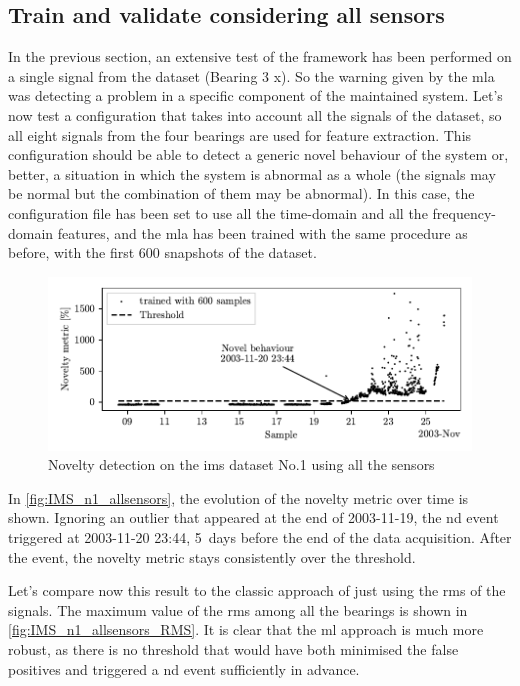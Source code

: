 \subsection{Train and validate considering all sensors}
In the previous section, an extensive test of the framework has been performed on a single signal from the dataset (Bearing 3 x). So the warning given by the \gls{mla} was detecting a problem in a specific component of the maintained system. Let's now test a configuration that takes into account all the signals of the dataset, so all eight signals from the four bearings are used for feature extraction. This configuration should be able to detect a generic novel behaviour of the system or, better, a situation in which the system is abnormal as a whole (the signals may be normal but the combination of them may be abnormal).  In this case, the configuration file has been set to use all the time-domain and all the frequency-domain features, and the \gls{mla} has been trained with the same procedure as before, with the first 600 snapshots of the dataset. 


\begin{figure}
    \centering
    \includegraphics{images/IMS/Novelty_01_500samples_allsensors.pdf}
    \caption{Novelty detection on the \gls{ims} dataset No.1 using all the sensors}
    \label{fig:IMS_n1_allsensors}
\end{figure}

In \autoref{fig:IMS_n1_allsensors}, the evolution of the novelty metric over time is shown. Ignoring an outlier that appeared at the end of 2003-11-19, the \gls{nd} event triggered at 2003-11-20 23:44, 5~days before the end of the data acquisition. After the event, the novelty metric stays consistently over the threshold.

Let's compare now this result to the classic approach of just using the \gls{rms} of the signals. The maximum value of the \gls{rms} among all the bearings is shown in \autoref{fig:IMS_n1_allsensors_RMS}. It is clear that the \gls{ml} approach is much more robust, as there is no threshold that would have both minimised the false positives and triggered a \gls{nd} event sufficiently in advance.

